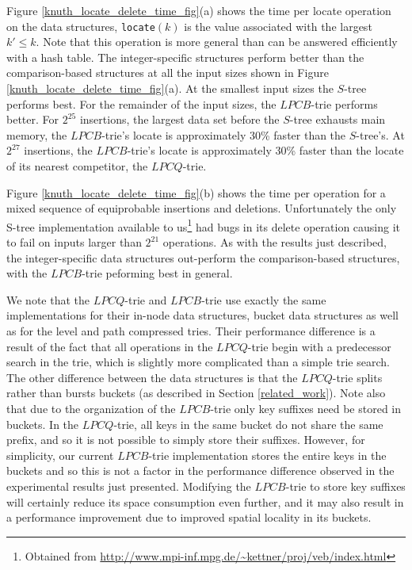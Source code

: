 \documentclass[]{acmtrans2m}
\begin{document}
Figure \ref{knuth_locate_delete_time_fig}(a) shows the time per locate operation on the data structures, \texttt{locate}$(k)$ is the value associated
with the largest $k' \leq k$. Note that this operation is more general than can be answered efficiently with a hash table.
The integer-specific structures perform better than the comparison-based structures at all the input sizes shown in Figure \ref{knuth_locate_delete_time_fig}(a).
At the smallest input sizes the $S$-tree performs best. For the remainder of the input sizes, the $LPCB$-trie performs better. For $2^{25}$ insertions, the largest
data set before the $S$-tree exhausts main memory, the $LPCB$-trie's locate is approximately 30\% faster than the $S$-tree's. 
At $2^{27}$ insertions, the $LPCB$-trie's locate is approximately 30\% faster than the locate of its nearest competitor, the $LPCQ$-trie. 

Figure \ref{knuth_locate_delete_time_fig}(b) shows the time per operation for a mixed sequence of equiprobable insertions and deletions.
Unfortunately the only S-tree implementation available to us\footnote{Obtained
from \url{http://www.mpi-inf.mpg.de/~kettner/proj/veb/index.html}} had bugs in its delete operation causing it to
fail on inputs larger than $2^{21}$ operations. As with the results just described, the integer-specific data structures out-perform the
comparison-based structures, with the $LPCB$-trie peforming best in general.

We note that the $LPCQ$-trie and $LPCB$-trie use exactly the same implementations for their in-node data structures, bucket data structures as well as for the
level and path compressed tries. Their performance difference is a result of the fact that all operations in the $LPCQ$-trie begin with 
a predecessor search in the trie, which is slightly more complicated than a simple trie search. The other difference between the data structures
is that the $LPCQ$-trie splits rather than bursts buckets (as described in Section \ref{related_work}). Note also that due to the organization
of the $LPCB$-trie only key suffixes need be stored in buckets. In the $LPCQ$-trie, all keys in the same bucket do not share the same prefix, and so
it is not possible to simply store their suffixes. However, for simplicity, our current $LPCB$-trie implementation stores the entire keys in the buckets
and so this is not a factor in the performance difference observed in the experimental results just presented. Modifying the $LPCB$-trie
to store key suffixes will certainly reduce its space consumption even further, and it may also result in a performance improvement due to improved
spatial locality in its buckets.
\end{document}
